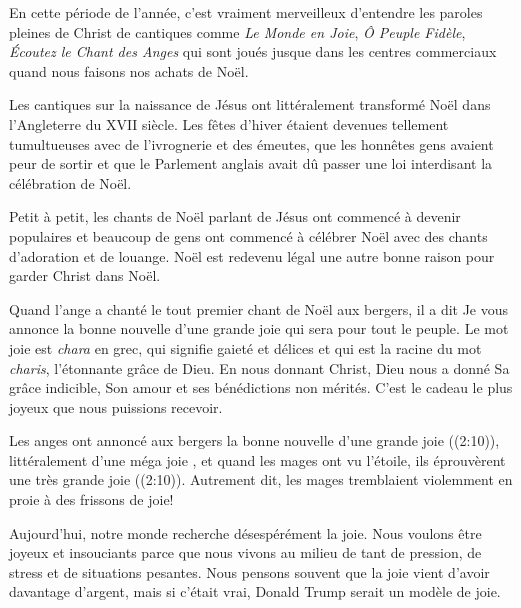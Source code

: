 


En cette période de l'année, c'est vraiment merveilleux d'entendre les paroles \Og pleines de Christ \Fg{} de cantiques comme \emph{Le Monde en Joie}, \emph{Ô Peuple Fidèle}, \emph{Écoutez le Chant des Anges} qui sont joués jusque dans les centres commerciaux quand nous faisons nos achats de Noël.

Les cantiques sur la naissance de Jésus ont littéralement transformé Noël dans l'Angleterre du XVII siècle. Les fêtes d'hiver étaient devenues tellement tumultueuses avec de l'ivrognerie et des émeutes, que les honnêtes gens avaient peur de sortir et que le Parlement anglais avait dû passer une loi interdisant la célébration de Noël.

Petit à petit, les chants de Noël parlant de Jésus ont commencé à devenir populaires et beaucoup de gens ont commencé à célébrer Noël avec des chants d'adoration et de louange. Noël est redevenu légal \ocadr une autre bonne raison pour garder Christ dans Noël.

Quand l'ange a chanté le tout premier chant de Noël aux bergers, il a dit\frcolon{}
\Og Je vous annonce la bonne nouvelle d’une grande joie qui sera pour tout le peuple. \Fg{}
Le mot \Og joie \Fg{} est \emph{chara} en grec, qui signifie \Og gaieté et délices \Fg{} et qui est la racine du mot \emph{charis}, l'étonnante grâce de Dieu. En nous donnant Christ, Dieu nous a donné Sa grâce indicible, Son amour et ses bénédictions non mérités. C'est le cadeau le plus joyeux que nous puissions recevoir.

Les anges ont annoncé aux bergers la \Og bonne nouvelle d'une grande joie \Fg{} ((2:10)), littéralement d'une \Og méga joie \Fg{}, et quand les mages ont vu l'étoile, \Og ils éprouvèrent une très grande joie \Fg{} ((2:10)). Autrement dit, les mages \Og tremblaient violemment en proie à des frissons de joie! \Fg{}

Aujourd'hui, notre monde recherche désespérément la joie. Nous voulons être joyeux et insouciants parce que nous vivons au milieu de tant de pression, de stress et de situations pesantes. Nous pensons souvent que la joie vient d'avoir davantage d'argent, mais si c'était vrai, Donald Trump serait un modèle de joie.

